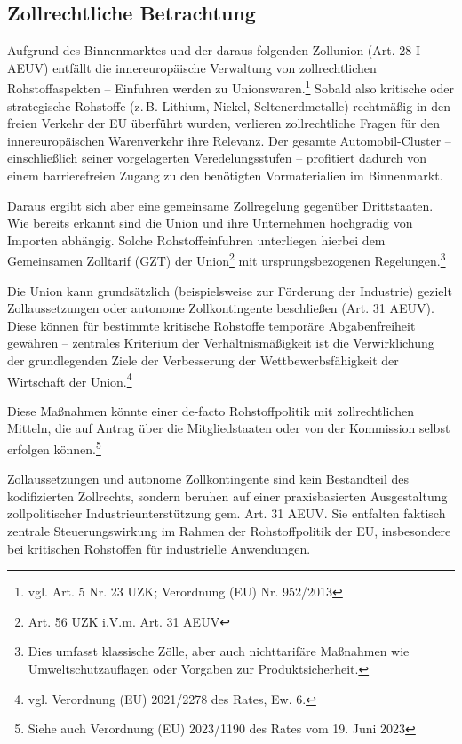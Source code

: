 \documentclass[12pt,a4paper,oneside]{book} %
\begin{document}
{	



\subsection{Zollrechtliche Betrachtung}
Aufgrund des Binnenmarktes und der daraus folgenden Zollunion (Art. 28 I AEUV) entfällt die innereuropäische Verwaltung von zollrechtlichen Rohstoffaspekten -- Einfuhren werden zu \glqq Unionswaren\grqq.\footnote{vgl. Art. 5 Nr. 23 UZK; Verordnung (EU) Nr. 952/2013} Sobald also kritische oder strategische Rohstoffe (z. B. Lithium, Nickel, Seltenerdmetalle) rechtmäßig in den freien Verkehr der EU überführt wurden, verlieren zollrechtliche Fragen für den innereuropäischen Warenverkehr ihre Relevanz. Der gesamte Automobil-Cluster – einschließlich seiner vorgelagerten Veredelungsstufen – profitiert dadurch von einem barrierefreien Zugang zu den benötigten Vormaterialien im Binnenmarkt.

Daraus ergibt sich aber eine gemeinsame Zollregelung gegenüber Drittstaaten. Wie bereits erkannt sind die Union und ihre Unternehmen hochgradig von Importen abhängig. Solche Rohstoffeinfuhren unterliegen hierbei dem Gemeinsamen Zolltarif (GZT) der Union\footnote{Art. 56 UZK i.V.m. Art. 31 AEUV} mit ursprungsbezogenen Regelungen.\footnote{Dies umfasst klassische Zölle, aber auch nichttarifäre Maßnahmen wie Umweltschutzauflagen oder Vorgaben zur Produktsicherheit.}

Die Union kann grundsätzlich (beispielsweise zur Förderung der Industrie) gezielt Zollaussetzungen oder autonome Zollkontingente beschließen (Art. 31 AEUV). Diese können für bestimmte kritische Rohstoffe temporäre Abgabenfreiheit gewähren -- zentrales Kriterium der Verhältnismäßigkeit ist die Verwirklichung der grundlegenden Ziele der Verbesserung der Wettbewerbsfähigkeit der Wirtschaft der Union.\footnote{vgl. Verordnung (EU) 2021/2278 des Rates, Ew. 6.}

Diese Maßnahmen könnte einer de-facto Rohstoffpolitik mit zollrechtlichen Mitteln, die auf Antrag über die Mitgliedstaaten oder von der Kommission selbst erfolgen können.\footnote{Siehe auch Verordnung (EU) 2023/1190 des Rates vom 19. Juni 2023}

Zollaussetzungen und autonome Zollkontingente sind kein Bestandteil des kodifizierten Zollrechts, sondern beruhen auf einer praxisbasierten Ausgestaltung zollpolitischer Industrieunterstützung gem. Art. 31 AEUV. Sie entfalten faktisch zentrale Steuerungswirkung im Rahmen der Rohstoffpolitik der EU, insbesondere bei kritischen Rohstoffen für industrielle Anwendungen.

}
\end{document}
